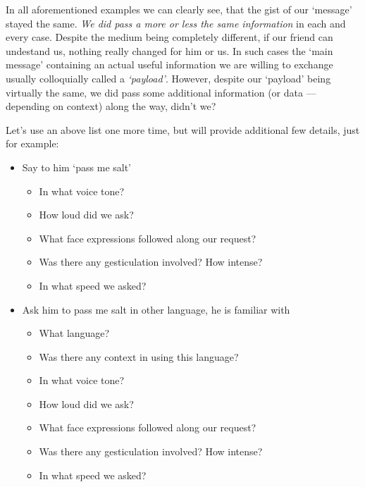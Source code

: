\documentclass{article}
\begin{document}
            In all aforementioned examples we can clearly see, that the gist of our `message' stayed the same. \emph{We did pass a more or less the same information} in 
            each and every case. Despite the medium being completely different, if our friend can undestand us, nothing really changed for him or us. In such cases
            the `main message' containing an actual useful information we are willing to exchange usually colloquially called a \emph{`payload'}. However,
            despite our `payload' being virtually the same, we did pass some additional information (or data --- depending on context) along the way, didn't we?

            Let's use an above list one more time, but will provide additional few details, just for example:

            \begin{itemize}
                \item Say to him `pass me salt'
                \begin{itemize}
                    \item In what voice tone?
                    \item How loud did we ask?
                    \item What face expressions followed along our request?
                    \item Was there any gesticulation involved? How intense?
                    \item In what speed we asked?
                \end{itemize}

                \item Ask him to pass me salt in other language, he is familiar with
                \begin{itemize}
                    \item What language?
                    \item Was there any context in using this language?
                    \item In what voice tone?
                    \item How loud did we ask?
                    \item What face expressions followed along our request?
                    \item Was there any gesticulation involved? How intense?
                    \item In what speed we asked?
                \end{itemize}


\end{itemize}
\end{document}
